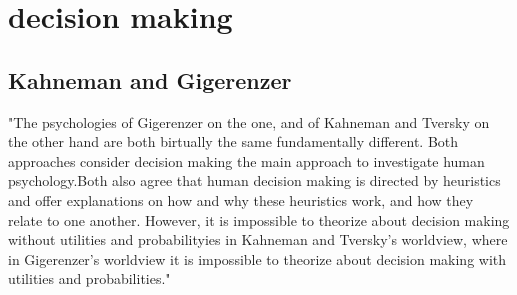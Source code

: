 \documentclass{article}
\begin{document}
\section{decision making}
\subsection{Kahneman and Gigerenzer}

"The psychologies of Gigerenzer on the one, and of Kahneman and Tversky on the other hand are both birtually the same fundamentally different. Both approaches consider decision making the main approach to investigate human psychology.Both also agree that human decision making is directed by heuristics and offer explanations on how and why these heuristics work, and how they relate to one another. However, it is impossible to theorize about decision making without utilities and probabilityies in Kahneman and Tversky's worldview, where in Gigerenzer's worldview it is impossible to theorize  about decision making  with utilities and probabilities."\cite{Heukelom2005}\\




\end{document}
